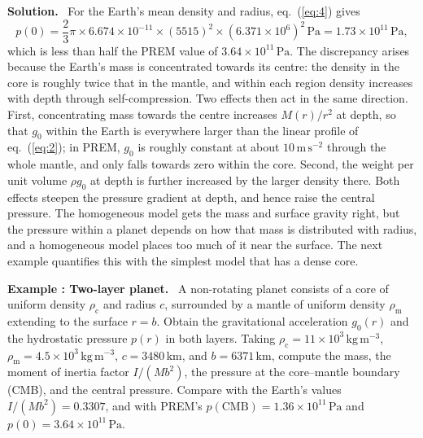 \documentclass[a4paper,12pt]{paper}
\newcounter{example}
\renewenvironment{example}[1]{%
  \refstepcounter{example}%
  \begin{mdframed}[linewidth=1pt,innertopmargin=6pt,innerbottommargin=6pt]%
  \noindent\textbf{Example \theexample: #1.}\ }{%
  \end{mdframed}}
\newenvironment{solution}{\par\noindent\textbf{Solution.}\ }{\par\medskip}
\begin{document}
\begin{solution}
For the Earth's mean density and radius, eq.~(\ref{eq:4}) gives
\begin{equation}
p(0)=\frac{2}{3}\pi\times6.674\times10^{-11}\times(5515)^{2}\times(6.371\times10^{6})^{2}\,\mathrm{Pa}
=1.73\times10^{11}\,\mathrm{Pa},
\label{eq:6}
\end{equation}
which is less than half the PREM value of $3.64\times10^{11}\,\mathrm{Pa}$. The discrepancy arises
because the Earth's mass is concentrated towards its centre: the density in the core is roughly
twice that in the mantle, and within each region density increases with depth through
self-compression. Two effects then act in the same direction. First, concentrating mass towards
the centre increases $M(r)/r^{2}$ at depth, so that $g_{0}$ within the Earth is everywhere larger
than the linear profile of eq.~(\ref{eq:2}); in PREM, $g_{0}$ is roughly constant at about
$10\,\mathrm{m\,s^{-2}}$ through the whole mantle, and only falls towards zero within the core.
Second, the weight per unit volume $\rho g_{0}$ at depth is further increased by the larger
density there. Both effects steepen the pressure gradient at depth, and hence raise the central
pressure. The homogeneous model gets the mass and surface gravity right, but the pressure
within a planet depends on how that mass is distributed with radius, and a homogeneous model
places too much of it near the surface. The next example quantifies this with the simplest
model that has a dense core.
\end{solution}

\begin{example}{Two-layer planet}
A non-rotating planet consists of a core of uniform density $\rho_{\mathrm{c}}$ and radius
$c$, surrounded by a mantle of uniform density $\rho_{\mathrm{m}}$ extending to the surface
$r=b$. Obtain the gravitational acceleration $g_{0}(r)$ and the hydrostatic pressure $p(r)$ in
both layers. Taking $\rho_{\mathrm{c}}=11\times10^{3}\,\mathrm{kg\,m^{-3}}$,
$\rho_{\mathrm{m}}=4.5\times10^{3}\,\mathrm{kg\,m^{-3}}$, $c=3480\,\mathrm{km}$, and
$b=6371\,\mathrm{km}$, compute the mass, the moment of inertia factor $I/(Mb^{2})$, the pressure
at the core--mantle boundary (CMB), and the central pressure. Compare with the Earth's values
$I/(Mb^{2})=0.3307$, and with PREM's $p(\mathrm{CMB})=1.36\times10^{11}\,\mathrm{Pa}$ and
$p(0)=3.64\times10^{11}\,\mathrm{Pa}$.
\end{example}
\end{document}
